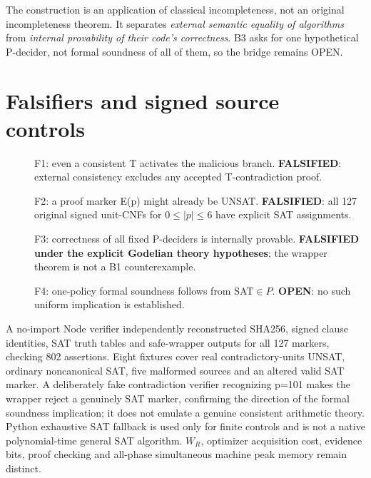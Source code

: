 \documentclass[11pt]{article}
\begin{document}
\noindent The construction is an application of classical incompleteness, not an original incompleteness theorem. It separates \emph{external semantic equality of algorithms} from \emph{internal provability of their code's correctness}. B3 asks for one hypothetical P-decider, not formal soundness of all of them, so the bridge remains OPEN.

\section*{Falsifiers and signed source controls}
\begin{description}
\item[] F1: even a consistent T activates the malicious branch. \textbf{FALSIFIED}: external consistency excludes any accepted T-contradiction proof.
\item[] F2: a proof marker E(p) might already be UNSAT. \textbf{FALSIFIED}: all 127 original signed unit-CNFs for $0\le |p|\le6$ have explicit SAT assignments.
\item[] F3: correctness of all fixed P-deciders is internally provable. \textbf{FALSIFIED under the explicit Godelian theory hypotheses}; the wrapper theorem is not a B1 counterexample.
\item[] F4: one-policy formal soundness follows from SAT$\in P$. \textbf{OPEN}: no such uniform implication is established.
\end{description}
A no-import Node verifier independently reconstructed SHA256, signed clause identities, SAT truth tables and safe-wrapper outputs for all 127 markers, checking 802 assertions. Eight fixtures cover real contradictory-units UNSAT, ordinary noncanonical SAT, five malformed sources and an altered valid SAT marker. A deliberately fake contradiction verifier recognizing p=101 makes the wrapper reject a genuinely SAT marker, confirming the direction of the formal soundness implication; it does not emulate a genuine consistent arithmetic theory. Python exhaustive SAT fallback is used only for finite controls and is not a native polynomial-time general SAT algorithm. $W_R$, optimizer acquisition cost, evidence bits, proof checking and all-phase simultaneous machine peak memory remain distinct.
\end{document}

